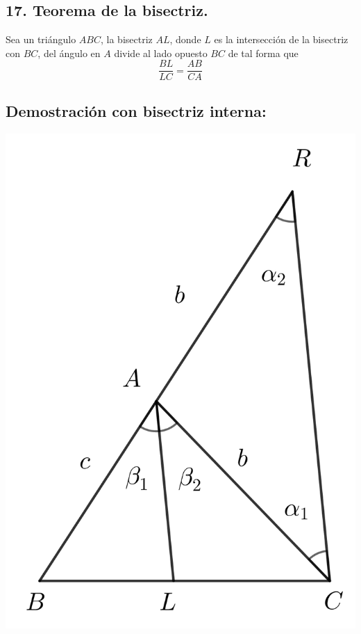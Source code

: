 \documentclass[12pt,a4paper]{article}
\begin{document}
\subsection*{17. Teorema de la bisectriz.}
Sea un triángulo $ABC$, la bisectriz $AL$, donde $L$ es la intersección de la bisectriz con $BC$, del ángulo en $A$ divide al lado opuesto $BC$ de tal forma que
$$\dfrac{BL}{LC}=\dfrac{AB}{CA}$$
\subsection*{Demostración con bisectriz interna:}
\begin{center}
\includegraphics[scale=0.6]{bisectriz_int.png} 
\end{center}
\end{document}
